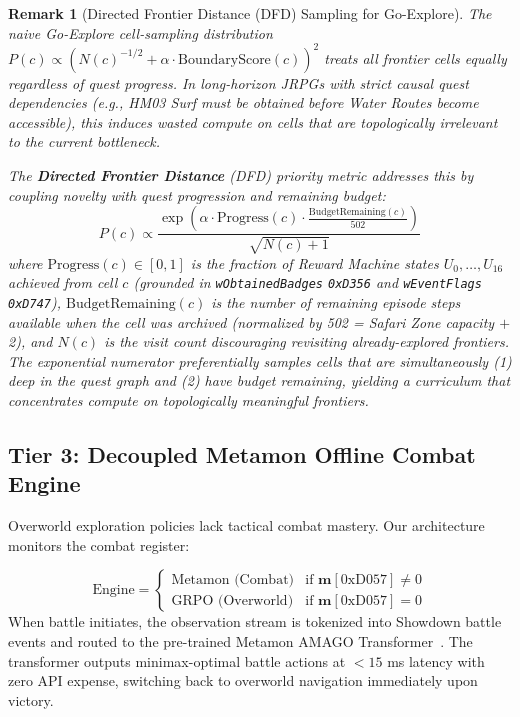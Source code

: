 \documentclass[journal,10pt,twocolumn]{IEEEtran}
\newtheorem{remark}{Remark}
\begin{document}
\begin{remark}[Directed Frontier Distance (DFD) Sampling for Go-Explore]
\label{rem:dfd}
The naive Go-Explore cell-sampling distribution $P(c) \propto (N(c)^{-1/2} + \alpha \cdot \text{BoundaryScore}(c))^2$ treats all frontier cells equally regardless of quest progress. In long-horizon JRPGs with strict causal quest dependencies (e.g., HM03 Surf must be obtained before Water Routes become accessible), this induces wasted compute on cells that are topologically irrelevant to the current bottleneck.

The \textbf{Directed Frontier Distance} (DFD) priority metric addresses this by coupling novelty with quest progression and remaining budget:
\begin{equation}
\label{eq:dfd}
P(c) \propto \frac{\exp\!\left(\alpha \cdot \text{Progress}(c) \cdot \frac{\text{BudgetRemaining}(c)}{502}\right)}{\sqrt{N(c) + 1}}
\end{equation}
where $\text{Progress}(c) \in [0, 1]$ is the fraction of Reward Machine states $U_0, \dots, U_{16}$ achieved from cell $c$ (grounded in \texttt{wObtainedBadges} \texttt{0xD356} and \texttt{wEventFlags} \texttt{0xD747}), $\text{BudgetRemaining}(c)$ is the number of remaining episode steps available when the cell was archived (normalized by 502 = Safari Zone capacity $+$ 2), and $N(c)$ is the visit count discouraging revisiting already-explored frontiers. The exponential numerator preferentially samples cells that are simultaneously (1) deep in the quest graph and (2) have budget remaining, yielding a curriculum that concentrates compute on topologically meaningful frontiers.
\end{remark}


\subsection{Tier 3: Decoupled Metamon Offline Combat Engine}
Overworld exploration policies lack tactical combat mastery. Our architecture monitors the combat register:

\begin{equation}
\text{Engine} = \begin{cases}
\text{Metamon (Combat)} & \text{if } \mathbf{m}[\text{0xD057}] \ne 0 \\
\text{GRPO (Overworld)} & \text{if } \mathbf{m}[\text{0xD057}] = 0
\end{cases}
\end{equation}
When battle initiates, the observation stream is tokenized into Showdown battle events and routed to the pre-trained Metamon AMAGO Transformer~\cite{grigsby2025metamon,grigsby2024amago}. The transformer outputs minimax-optimal battle actions at $<15$ ms latency with zero API expense, switching back to overworld navigation immediately upon victory.
\end{document}
